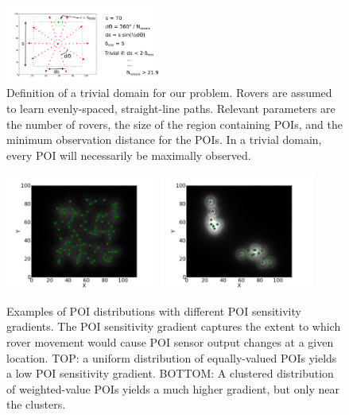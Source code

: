\documentclass[letterpaper, 10 pt, conference]{ieeeconf}  %
\begin{document}
\begin{figure}[h!]
    \centering
    \includegraphics[width=0.45\textwidth]{triviality.png}
    \caption{Definition of a trivial domain for our problem. Rovers are assumed to learn evenly-spaced, straight-line paths. Relevant parameters are the number of rovers, the size of the region containing POIs, and the minimum observation distance for the POIs. In a trivial domain, every POI will necessarily be maximally observed. }
    \label{fig:triviality}
\end{figure}

\begin{figure}[h!]
    \centering
    \includegraphics[width=0.45\textwidth]{sensitivity-spread-0.png}
    \includegraphics[width=0.45\textwidth]{sensitivity-clustered-1.png}
    \caption{Examples of POI distributions with different POI sensitivity gradients. The POI sensitivity gradient captures the extent to which rover movement would cause POI sensor output changes at a given location. TOP: a uniform distribution of equally-valued POIs yields a low POI sensitivity gradient. BOTTOM: A clustered distribution of weighted-value POIs yields a much higher gradient, but only near the clusters. }
    \label{fig:signal-contrast}
\end{figure}
\end{document}
